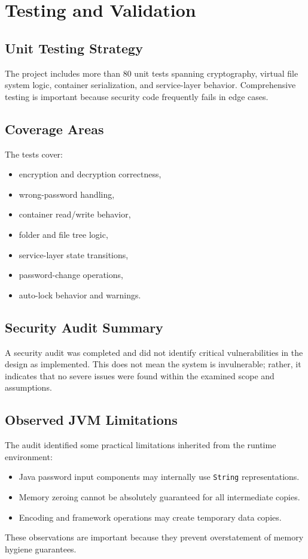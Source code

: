 \documentclass[12pt,a4paper]{report}
\begin{document}
\chapter{Testing and Validation}
\section{Unit Testing Strategy}
The project includes more than 80 unit tests spanning cryptography, virtual file system logic, container serialization, and service-layer behavior. Comprehensive testing is important because security code frequently fails in edge cases.

\section{Coverage Areas}
The tests cover:
\begin{itemize}
  \item encryption and decryption correctness,
  \item wrong-password handling,
  \item container read/write behavior,
  \item folder and file tree logic,
  \item service-layer state transitions,
  \item password-change operations,
  \item auto-lock behavior and warnings.
\end{itemize}

\section{Security Audit Summary}
A security audit was completed and did not identify critical vulnerabilities in the design as implemented. This does not mean the system is invulnerable; rather, it indicates that no severe issues were found within the examined scope and assumptions.

\section{Observed JVM Limitations}
The audit identified some practical limitations inherited from the runtime environment:
\begin{itemize}
  \item Java password input components may internally use \texttt{String} representations.
  \item Memory zeroing cannot be absolutely guaranteed for all intermediate copies.
  \item Encoding and framework operations may create temporary data copies.
\end{itemize}
These observations are important because they prevent overstatement of memory hygiene guarantees.
\end{document}
